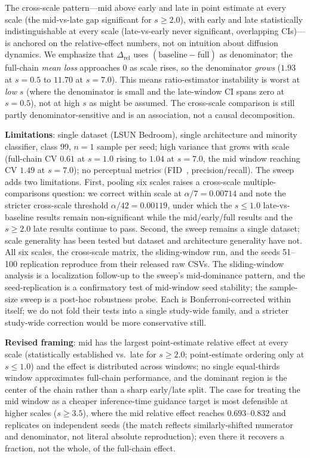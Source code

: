 \documentclass[10pt]{article}
\begin{document}
The cross-scale pattern---mid above early and late in point estimate at every
scale (the mid-vs-late gap significant for $s\ge2.0$), with early and late
statistically indistinguishable at every scale (late-vs-early never significant,
overlapping CIs)---is anchored on the
relative-effect numbers, not on intuition about diffusion dynamics.  We
emphasize that $\Delta_\mathrm{rel}$ uses $(\text{baseline}-\overline{\text{full}})$
as denominator; the full-chain \emph{mean loss} approaches $0$ as scale rises,
so the denominator \emph{grows} ($1.93$ at $s=0.5$ to $11.70$ at $s=7.0$).
This means ratio-estimator instability is worst at \emph{low} $s$ (where the
denominator is small and the late-window CI spans zero at $s=0.5$), not at high
$s$ as might be assumed.  The cross-scale comparison is still partly
denominator-sensitive and is an association, not a causal decomposition.

\textbf{Limitations}: single dataset (LSUN Bedroom), single architecture and
minority classifier, class 99, $n=1$ sample per seed; high variance that grows
with scale (full-chain CV $0.61$ at $s=1.0$ rising to $1.04$ at $s=7.0$, the mid
window reaching CV $1.49$ at $s=7.0$); no perceptual metrics (FID~\cite{heusel2017fid},
precision/recall).  The sweep adds two limitations.  First, pooling six scales
raises a cross-scale multiple-comparisons question: we correct within scale at
$\alpha/7=0.00714$ and note the stricter cross-scale threshold
$\alpha/42=0.00119$, under which the $s\le 1.0$ late-vs-baseline results remain
non-significant while the mid/early/full results and the $s\ge 2.0$ late results
continue to pass.  Second, the sweep remains a single dataset; scale generality
has been tested but dataset and architecture generality have not.  All six
scales, the cross-scale matrix, the sliding-window run, and the seeds 51--100
replication reproduce from their released raw CSVs.  The sliding-window analysis is a localization follow-up
to the sweep's mid-dominance pattern, and the seed-replication is a confirmatory
test of mid-window seed stability; the sample-size sweep is a post-hoc
robustness probe.  Each is Bonferroni-corrected within itself; we do not fold
their tests into a single study-wide family, and a stricter study-wide
correction would be more conservative still.

\textbf{Revised framing}: mid has the largest point-estimate relative effect at
every scale (statistically established vs.\ late for $s\ge2.0$; point-estimate
ordering only at $s\le1.0$) and the effect is distributed across windows; no
single equal-thirds window approximates full-chain performance, and the dominant
region is the center of the chain rather than a sharp early/late split.  The
case for treating the mid window as a cheaper inference-time guidance target is
most defensible at higher scales ($s\ge 3.5$), where the mid relative effect
reaches $0.693$--$0.832$ and replicates on independent seeds (the match reflects
similarly-shifted numerator and denominator, not literal absolute reproduction);
even there it recovers a fraction, not the whole, of the full-chain effect.
\end{document}
